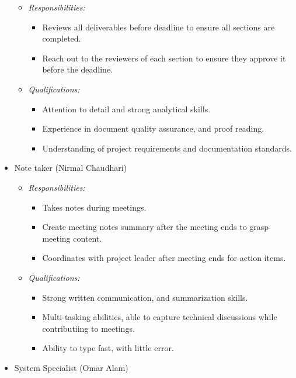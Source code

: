 \documentclass[12pt]{article}
\theoremstyle{definition}
\begin{document}
\begin{itemize}
\begin{itemize}
      \item \textit{Responsibilities:}
        \begin{itemize}
          \item Reviews all deliverables before deadline to ensure all sections
           are completed.
          \item Reach out to the reviewers of each section to ensure they 
          approve it before the deadline.
        \end{itemize}
      \item \textit{Qualifications:}
        \begin{itemize}
          \item Attention to detail and strong analytical skills.
          \item Experience in document quality assurance, and proof reading. 
          \item Understanding of project requirements and documentation 
          standards. 
        \end{itemize}
    \end{itemize}
  \item Note taker (Nirmal Chaudhari)
    \begin{itemize}
      \item \textit{Responsibilities:}
        \begin{itemize}
          \item Takes notes during meetings.
          \item Create meeting notes summary after the meeting ends to grasp 
          meeting content.
          \item Coordinates with project leader after meeting ends for action 
          items. 
        \end{itemize}
      \item \textit{Qualifications:}
        \begin{itemize}
          \item Strong written communication, and summarization skills. 
          \item Multi-tasking abilities, able to capture technical discussions 
          while contributiing to meetings. 
          \item Ability to type fast, with little error. 
        \end{itemize}
    \end{itemize}
  \item System Specialist (Omar Alam)
    \begin{itemize}

\end{itemize}
\end{itemize}
\end{document}
